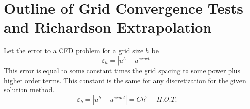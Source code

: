 \documentclass[11pt]{article}
\begin{document}
\doublespacing
\MOONSTITLE
\maketitle

\section{Outline of Grid Convergence Tests and Richardson Extrapolation}
Let the error to a CFD problem for a grid size $h$ be
\begin{equation}
	\varepsilon_{h} = |u^{h} - u^{exact}|
\end{equation}
This error is equal to some constant times the grid spacing to some power plus higher order terms. This constant is the same for any discretization for the given solution method.
\begin{equation}
	\varepsilon_{h}
	=
	|u^{h} - u^{exact}|
	=
	C h^p + H.O.T.
\end{equation}
\end{document}
